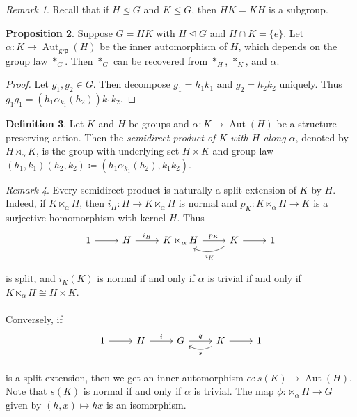 \documentclass[10pt,letterpaper,cm]{nupset}
\theoremstyle{definition}
\newtheorem{definition}{Definition}[subsection]
\theoremstyle{theorem}
\newtheorem{prop}[definition]{Proposition}
\theoremstyle{remark}
\newtheorem{remark}[definition]{Remark}
\newcommand{\1}{\mathbf{1}}
\newcommand{\0}{\vec 0}
\DeclareMathOperator{\aut}{Aut}
\begin{document}
\begin{remark}
Recall that if $H \unlhd G$ and $K \leq G$, then $HK = KH$ is a subgroup.
\end{remark}

\begin{prop}
Suppose $G = HK$ with $H\unlhd G$ and $H \cap K = \{e\}$. Let $\alpha : K \to \aut_{\mathsf{grp}}(H)$ be the inner automorphism of $H$, which depends on the group law $*_G$. Then $*_G$ can be recovered from $*_H$, $*_K$, and $\alpha$.
\end{prop}
\begin{proof}
Let $g_1, g_2 \in G$. Then decompose $g_1 = h_1k_1$ and $g_2= h_2k_2$ uniquely. Thus $g_1g_1 = (h_1\alpha_{k_1}(h_2))k_1k_2$.
\end{proof}

\begin{definition}
Let $K$ and $H$ be groups and $\alpha : K \to \aut(H)$ be a structure-preserving action. Then the \textit{semidirect product of $K$ with $H$ along $\alpha$}, denoted by $H \rtimes_{\alpha} K$, is the group with underlying set $H \times K$ and group law $(h_1, k_1)(h_2, k_2) \coloneqq  (h_1 \alpha_{k_1}(h_2), k_1k_2)$.
\end{definition}

\begin{remark}
Every semidirect product is naturally a split extension of $K$ by $H$. Indeed, if $K \ltimes_{\alpha} H$, then $i_H : H \to K \ltimes_{\alpha} H$ is normal and $p_K : K\ltimes_{\alpha} H \to K$ is a surjective homomorphism with kernel $H$. Thus \[
	\begin{tikzcd}
	1\rar &H\rar["i_H" above] & K\ltimes_{\alpha} H \rar["p_K" above] & K\rar\lar[bend left=30,"i_K" below] & 1 \\
	\end{tikzcd}
\] is split, and $i_K(K)$ is normal  if and only if $\alpha$ is trivial if and only if $K \ltimes_{\alpha} H \cong H \times K$.
\\ \\ Conversely, if 
\[
	\begin{tikzcd}
	1\rar &H\rar["i" above] & G \rar["q" above] & K\rar\lar[bend left=30,"s" below] & 1 \\
	\end{tikzcd}
\]
is a split extension, then we get an inner automorphism $\alpha : s(K) \to \aut(H)$. Note that $s(K)$ is normal if and only if $\alpha$ is trivial. The map $\phi : \ltimes_{\alpha} H \to G$ given by $(h,x) \mapsto hx$ is an isomorphism.
\end{remark}
\end{document}
